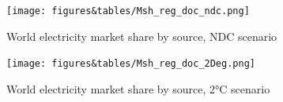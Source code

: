 \begin{figure}[H]
    \centerline{\texttt{[image: figures\&tables/Msh\_reg\_doc\_ndc.png]}}
    \caption{World electricity market share by source, NDC scenario}
    \label{fig:Msh_reg_ndc}
\end{figure}

\begin{figure}[H]
    \centerline{\texttt{[image: figures\&tables/Msh\_reg\_doc\_2Deg.png]}}
    \caption{World electricity market share by source, 2°C scenario}
    \label{fig:Msh_reg_2deg}
\end{figure}




